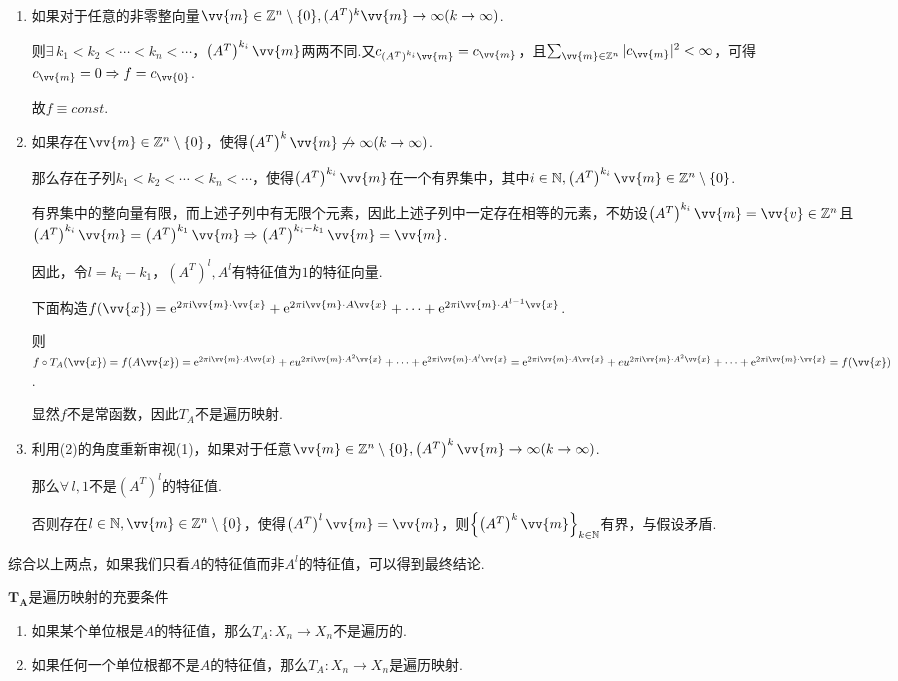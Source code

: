 \begin{enumerate}[(1)]
    \item 如果对于任意的非零整向量$\vv{m}\in\mb{Z}^n\setminus \{0\},(A^T)^k\vv{m}\to\infty(k\to\infty)$.\par
    则$\exists\, k_1<k_2<\cdots<k_n<\cdots$，$\left(A^T\right)^{k_i}\vv{m}$两两不同.又$c_{\left(A^T\right)^{k_i}\vv{m}}=c_{\vv{m}}$，且$\sum_{\vv{m}\in\mb{Z}^n}{|c_{\vv{m}}|^2}<\infty$，可得$c_{\vv{m}}=0\Rightarrow f=c_{\vv{0}}$.\par
    故$f\equiv const$.\par
    \item 如果存在$\vv{m}\in\mb{Z}^n\setminus\{0\}$，使得$\left(A^T\right)^k\vv{m}\not\to\infty(k\to\infty)$.\par
    那么存在子列$k_1<k_2<\cdots<k_n<\cdots$，使得$\left(A^T\right)^{k_i}\vv{m}$在一个有界集中，其中$i\in\mb{N},\left(A^T\right)^{k_i}\vv{m}\in\mb{Z}^n\setminus\{0\}$.\par
    有界集中的整向量有限，而上述子列中有无限个元素，因此上述子列中一定存在相等的元素，不妨设$\left(A^T\right)^{k_i}\vv{m}=\vv{v}\in\mb{Z}^n$且$\left(A^T\right)^{k_i}\vv{m}=\left(A^T\right)^{k_1}\vv{m}\Rightarrow \left(A^T\right)^{k_i-k_1}\vv{m}=\vv{m}$.\par
    因此，令$l=k_i-k_1$，$\left(A^T\right)^l,A^l$有特征值为$1$的特征向量.\par
    下面构造$f(\vv{x})=\eu^{2\pi\iu\vv{m}\cdot\vv{x}}+\eu^{2\pi\iu\vv{m}\cdot A\vv{x}}+\cdots+\eu^{2\pi\iu\vv{m}\cdot A^{l-1}\vv{x}}$.\par
    则$f\circ T_A(\vv{x})=f(A\vv{x})=\eu^{2\pi\iu\vv{m}\cdot A\vv{x}}+eu^{2\pi\iu\vv{m}\cdot A^2\vv{x}}+\cdots+\eu^{2\pi\iu\vv{m}\cdot A^{l}\vv{x}}=\eu^{2\pi\iu\vv{m}\cdot A\vv{x}}+eu^{2\pi\iu\vv{m}\cdot A^2\vv{x}}+\cdots+\eu^{2\pi\iu\vv{m}\cdot \vv{x}}=f(\vv{x})$.\par
    显然$f$不是常函数，因此$T_A$不是遍历映射.
    \item 利用(2)的角度重新审视(1)，如果对于任意$\vv{m}\in\mb{Z}^n\setminus \{0\},\left(A^T\right)^{k}\vv{m}\to\infty(k\to\infty)$.\par
    那么$\forall\, l,1$不是$\left(A^T\right)^l$的特征值.\par
    否则存在$l\in\mb{N},\vv{m}\in\mb{Z}^n\setminus\{0\}$，使得$\left(A^T\right)^l\vv{m}=\vv{m}$，则$\left\{\left(A^T\right)^k\vv{m}\right\}_{k\in\mb{N}}$有界，与假设矛盾.
\end{enumerate}
综合以上两点，如果我们只看$A$的特征值而非$A^l$的特征值，可以得到最终结论.
\begin{theorem}{$\bm{T_A}$是遍历映射的充要条件}
    \begin{enumerate}
        \item 如果某个单位根是$A$的特征值，那么$T_A:X_n\to X_n$不是遍历的.
        \item 如果任何一个单位根都不是$A$的特征值，那么$T_A:X_n\to X_n$是遍历映射.
    \end{enumerate}
\end{theorem}
